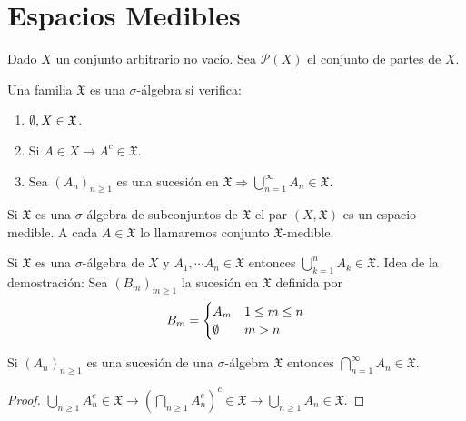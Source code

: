 \section{Espacios Medibles}

Dado $X$ un conjunto arbitrario no vacío. Sea $\mathcal{P}(X)$ el conjunto de partes de $X$.

\begin{definition}
    Una familia $\mathfrak{X}$ es una $\sigma$-álgebra si verifica:
    \begin{enumerate}
        \item $\emptyset, X \in \mathfrak{X}$.
        \item Si $A \in X \to A^c \in \mathfrak{X}$.
        \item Sea $(A_n)_{n \geq 1}$ es una sucesión en $\mathfrak{X} \Rightarrow \bigcup_{n=1}^{\infty} A_n \in \mathfrak{X}$.
    \end{enumerate}
\end{definition}

Si $\mathfrak{X}$ es una $\sigma$-álgebra de subconjuntos de $\mathfrak{X}$ el par $(X, \mathfrak{X})$ es un espacio medible. A cada $A \in \mathfrak{X}$
lo llamaremos conjunto $\mathfrak{X}$-medible.

\begin{note}
    Si $\mathfrak{X}$ es una $\sigma$-álgebra de $X$ y $A_1, \cdots A_n \in \mathfrak{X}$ entonces $\bigcup_{k=1}^{n} A_k \in \mathfrak{X}$.
    Idea de la demostración: Sea $(B_m)_{m \geq 1}$ la sucesión en $\mathfrak{X}$ definida por \begin{equation}
        B_m = \begin{cases}
            A_m & 1 \leq m \leq n \\
            \emptyset  & m > n
        \end{cases}
    \end{equation}
\end{note}

\begin{note}
    Si $(A_n)_{n \geq 1}$ es una sucesión de una $\sigma$-álgebra $\mathfrak{X}$ entonces $\bigcap_{n=1}^{\infty} A_n \in \mathfrak{X}$.
    \begin{proof}
        $\bigcup_{n \geq 1} A_n^c \in \mathfrak{X} \to (\bigcap_{n \geq 1} A_n^c)^c \in \mathfrak{X} \to \bigcup_{n \geq 1} A_n \in \mathfrak{X}$.
    \end{proof}
\end{note}

